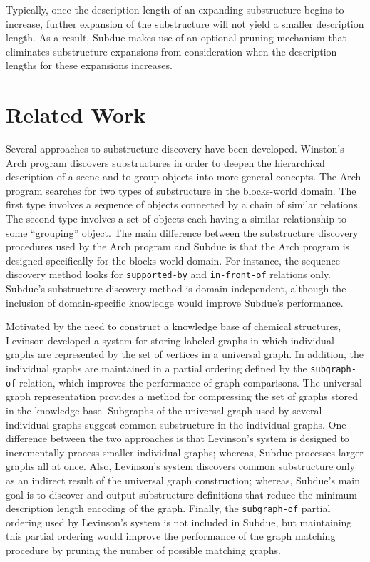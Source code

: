 Typically, once the description length
of an expanding substructure begins to increase,
further expansion of the substructure will not yield a smaller description
length.  As a
result, {\sc Subdue} makes use of an optional pruning mechanism that eliminates
substructure expansions from consideration when the description lengths
for these expansions increases.

\section{Related Work}
\label{s:relatedwork}

Several approaches to substructure discovery have been developed.
Winston's {\sc Arch} program \cite{winston/substructure} discovers
substructures in order to deepen the hierarchical description of a scene and
to group objects into more general concepts.  The {\sc Arch} program
searches for two types of substructure in the blocks-world domain.  The
first type involves a sequence of objects connected by a chain of similar
relations.  The second type involves a set of objects each having a similar
relationship to some ``grouping'' object.  The main difference between the
substructure discovery procedures used by the {\sc Arch} program and {\sc
Subdue} is that the {\sc Arch} program is designed specifically for the
blocks-world domain.  For instance, the sequence discovery method looks for
{\tt supported-by} and {\tt in-front-of} relations only.  {\sc Subdue}'s
substructure discovery method is domain independent, although the inclusion
of domain-specific knowledge would improve {\sc Subdue}'s performance.

Motivated by the need to construct a knowledge base of chemical structures,
Levinson \cite{levinson/aaai84} developed a system for storing labeled
graphs in which individual graphs are represented by the set of vertices in
a universal graph.  In addition, the individual graphs are maintained in a
partial ordering defined by the {\tt subgraph-of} relation, which improves
the performance of graph comparisons.  The universal graph representation
provides a method for compressing the set of graphs stored in the knowledge
base.  Subgraphs of the universal graph used by several individual graphs
suggest common substructure in the individual graphs.  One difference
between the two approaches is that Levinson's system is designed to
incrementally process smaller individual graphs; whereas, {\sc Subdue}
processes larger graphs all at once.  Also, Levinson's system discovers
common substructure only as an indirect result of the universal graph
construction; whereas, {\sc Subdue}'s main goal is to discover and output
substructure definitions that reduce the minimum description length
encoding of the graph.  Finally, the {\tt subgraph-of} partial ordering
used by Levinson's system is not included in {\sc Subdue}, but maintaining
this partial ordering would improve the performance of the graph matching
procedure by pruning the number of possible matching graphs.

